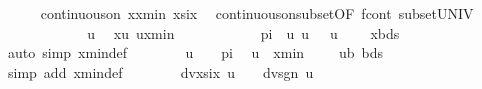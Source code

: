 \begin{isabellebody}
\ \ \ \ \isamarkupfalse%
\ {\isachardoublequoteopen}continuous{\isacharunderscore}{\kern0pt}on\ {\isacharbraceleft}{\kern0pt}x{\isachardot}{\kern0pt}{\isachardot}{\kern0pt}xmin{\isacharbraceright}{\kern0pt}\ xsix{\isachardoublequoteclose}\ \isamarkupfalse%
\ continuous{\isacharunderscore}{\kern0pt}on{\isacharunderscore}{\kern0pt}subset{\isacharbrackleft}{\kern0pt}OF\ f{\isacharunderscore}{\kern0pt}cont\ subset{\isacharunderscore}{\kern0pt}UNIV{\isacharbrackright}{\kern0pt}\ \isakeywordONE{{\isachardot}{\kern0pt}}\isamarkupfalse%
\isanewline
\ \ \ \ \isakeywordONE{{\isacharbraceleft}{\kern0pt}}\isamarkupfalse%
\isanewline
\ \ \ \ \ \ \isamarkupfalse%
\ u\ \isamarkupfalse%
\ {\isachardoublequoteopen}x{\isacharless}{\kern0pt}u{\isachardoublequoteclose}\ {\isachardoublequoteopen}u{\isacharless}{\kern0pt}xmin{\isachardoublequoteclose}\isanewline
\ \ \ \ \ \ \isamarkupfalse%
\ {\isachardoublequoteopen}{}\ {\isacharslash}{\kern0pt}\ {\isacharparenleft}{\kern0pt}{}\ {\isacharasterisk}{\kern0pt}\ pi{\isacharparenright}{\kern0pt}\ {\isacharless}{\kern0pt}\ u{\isachardoublequoteclose}\ {\isachardoublequoteopen}u\ {\isasymnoteq}\ {}{\isachardoublequoteclose}\ {\isachardoublequoteopen}u\ {\isachargreater}{\kern0pt}\ {}{\isachardoublequoteclose}\ \isamarkupfalse%
\ xbds\ \isamarkupfalse%
\ {\isacharparenleft}{\kern0pt}auto\ simp{\isacharcolon}{\kern0pt}\ xmin{\isacharunderscore}{\kern0pt}def{\isacharparenright}{\kern0pt}\isanewline
\isanewline
\ \ \ \ \ \ \isamarkupfalse%
\ {\isachardoublequoteopen}u\ {\isacharless}{\kern0pt}\ {}\ {\isacharslash}{\kern0pt}\ pi{\isachardoublequoteclose}\ \isamarkupfalse%
\ {\isacartoucheopen}u\ {\isacharless}{\kern0pt}\ xmin{\isacartoucheclose}\ {\isacartoucheopen}{}\ {\isacharslash}{\kern0pt}\ {\isasymxi}\ {\isasymle}\ ub{\isacartoucheclose}\ bds{\isacharparenleft}{\kern0pt}{}{\isacharcomma}{\kern0pt}{}{\isacharparenright}{\kern0pt}\ \isamarkupfalse%
\ {\isacharparenleft}{\kern0pt}simp\ add{\isacharcolon}{\kern0pt}\ xmin{\isacharunderscore}{\kern0pt}def{\isacharparenright}{\kern0pt}\isanewline
\isanewline
\ \ \ \ \ \ \isamarkupfalse%
\ {\isachardoublequoteopen}dvxsix\ u\ {\isacharless}{\kern0pt}\ {}\ {\isasymlongleftrightarrow}\ dvsgn\ {\isacharparenleft}{\kern0pt}{}{\isacharslash}{\kern0pt}u{\isacharparenright}{\kern0pt}\ {\isachargreater}{\kern0pt}\ {}{\isachardoublequoteclose}\isanewline

\end{isabellebody}
